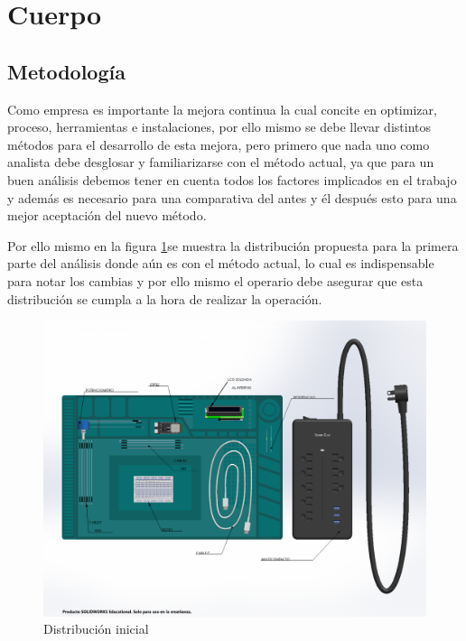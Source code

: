     
    \section{Cuerpo}
    
    \subsection{Metodología}
    
    Como empresa es importante la mejora continua la cual concite en optimizar, proceso, herramientas e instalaciones, por ello mismo se debe llevar distintos métodos para el desarrollo de esta mejora, pero primero que nada uno como analista debe desglosar y familiarizarse con el método actual, ya que para un buen análisis debemos tener en cuenta todos los factores implicados en el trabajo y además es necesario para una comparativa del antes y él después esto para una mejor aceptación del nuevo método.
    
    Por ello mismo en la figura \ref{fig:Distribucion inicial}se muestra la distribución propuesta para la primera parte del análisis donde aún es con el método actual, lo cual es indispensable para notar los cambias y por ello mismo el operario debe asegurar que esta distribución se cumpla a la hora de realizar la operación.
        \begin{figure}[H] 
        \centering
        \includegraphics[trim = {1mm 1mm 1mm 1mm},clip,scale=0.3]{22/Img/Ensamblaje.PDF}
        \caption{Distribución inicial}
        \label{fig:Distribucion inicial}
    \end{figure}
    
